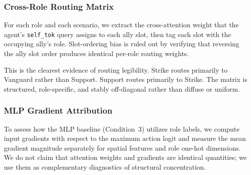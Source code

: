 \subsubsection{Cross-Role Routing Matrix}

For each role and each scenario, we extract the cross-attention weight that the agent's \texttt{self\_tok} query assigns to each ally slot, then tag each slot with the occupying ally's role. Slot-ordering bias is ruled out by verifying that reversing the ally slot order produces identical per-role routing weights.

\begin{table}[h]
\centering
\small
\caption{Role-routing matrix for Condition~1. Entry $(i,j)$ is the mean cross-attention weight assigned by role $i$ to ally slots occupied by role $j$. Diagonal entries are zero by construction.}
\label{tab:routing}
\setlength{\tabcolsep}{3pt}
\end{table}

This is the clearest evidence of routing legibility. Strike routes primarily to Vanguard rather than Support. Support routes primarily to Strike. The matrix is structured, role-specific, and stably off-diagonal rather than diffuse or uniform.

\subsubsection{MLP Gradient Attribution}

To assess how the MLP baseline (Condition~3) utilizes role labels, we compute input gradients with respect to the maximum action logit and measure the mean gradient magnitude separately for spatial features and role one-hot dimensions. We do not claim that attention weights and gradients are identical quantities; we use them as complementary diagnostics of structural concentration.

